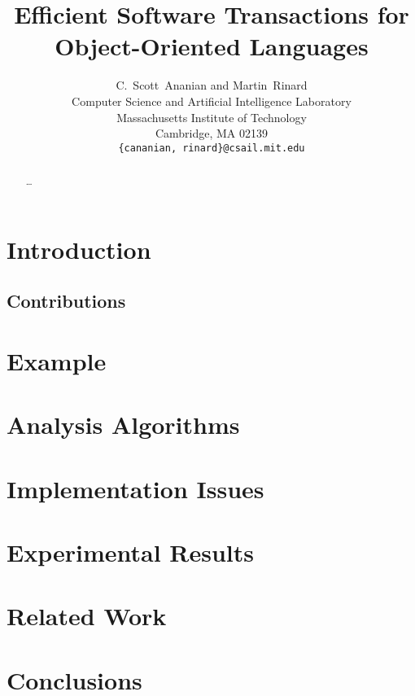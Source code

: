 \documentclass{acmconf}
\title{Efficient Software Transactions for Object-Oriented Languages}
\author{C.~Scott~Ananian and Martin~Rinard \\
Computer Science and Artificial Intelligence Laboratory\\
Massachusetts Institute of Technology\\ 
Cambridge, MA 02139 \\
{\tt \{cananian, rinard\}@csail.mit.edu}
}
\begin{document}

%
\maketitle
{}
%
\begin{abstract}
\ldots
\end{abstract}
%
\section{Introduction}

\subsection{Contributions}

\section{Example}

\section{Analysis Algorithms}

\section{Implementation Issues}

\section{Experimental Results}

\section{Related Work}

\section{Conclusions}

\renewcommand{\baselinestretch}{1}


%
\end{document}
